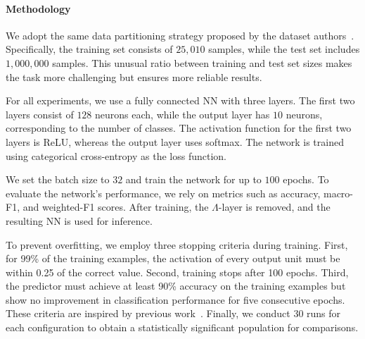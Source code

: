 \paragraph{Methodology}\label{par:phds-methodology}
%
We adopt the same data partitioning strategy proposed by the dataset authors~\cite{poker_hand_158}.
%
Specifically, the training set consists of $25,010$ samples, while the test set includes $1,000,000$ samples.
%
This unusual ratio between training and test set sizes makes the task more challenging but ensures more reliable results.

For all experiments, we use a fully connected \gls{NN} with three layers.
%
The first two layers consist of $128$ neurons each, while the output layer has $10$ neurons, corresponding to the number of classes.
%
The activation function for the first two layers is \gls{ReLU}, whereas the output layer uses softmax.
%
The network is trained using categorical cross-entropy as the loss function.

We set the batch size to $32$ and train the network for up to $100$ epochs.
%
To evaluate the network's performance, we rely on metrics such as accuracy, macro-F1, and weighted-F1 scores.
%
After training, the \(\Lambda\)-layer is removed, and the resulting \gls{NN} is used for inference.

To prevent overfitting, we employ three stopping criteria during training.
%
First, for 99\% of the training examples, the activation of every output unit must be within 0.25 of the correct value.
%
Second, training stops after 100 epochs.
%
Third, the predictor must achieve at least 90\% accuracy on the training examples but show no improvement in classification performance for five consecutive epochs.
%
These criteria are inspired by previous work~\cite{Towell90}.
%
Finally, we conduct 30 runs for each configuration to obtain a statistically significant population for comparisons.


